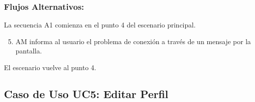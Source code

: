 \begin{framed}
\subsubsection{Flujos Alternativos: }

La secuencia A1 comienza en el punto 4 del escenario principal.
\begin{enumerate}
    \setcounter{enumi}{4}
    \item AM informa al usuario el problema de conexión a través de un mensaje por la pantalla.
\end{enumerate}
El escenario vuelve al punto 4.

\end{framed}



\subsection{Caso de Uso UC5: Editar Perfil}

